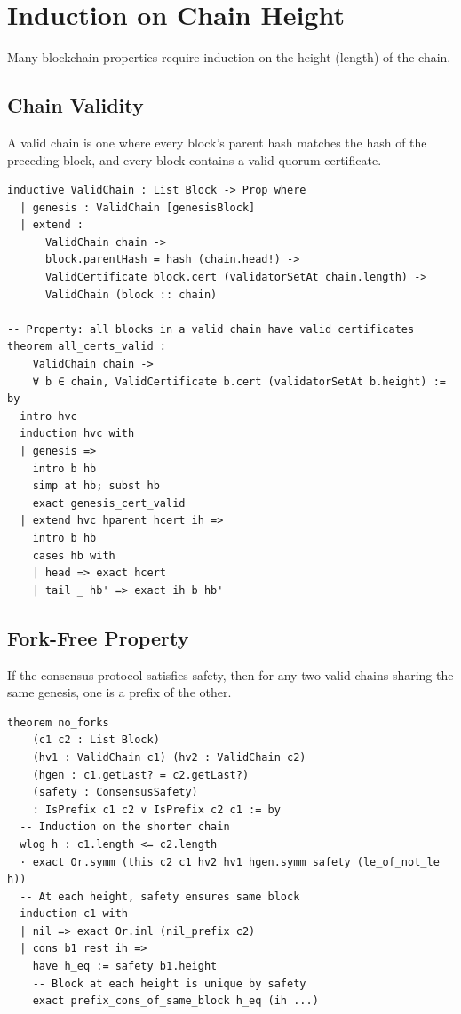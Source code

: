 \section{Induction on Chain Height}


Many blockchain properties require induction on the height (length) of the chain.

\subsection{Chain Validity}

A valid chain is one where every block's parent hash matches the hash of the preceding
block, and every block contains a valid quorum certificate.

\begin{lstlisting}[language=Lean,caption={Chain validity by induction on height}]
inductive ValidChain : List Block -> Prop where
  | genesis : ValidChain [genesisBlock]
  | extend :
      ValidChain chain ->
      block.parentHash = hash (chain.head!) ->
      ValidCertificate block.cert (validatorSetAt chain.length) ->
      ValidChain (block :: chain)

-- Property: all blocks in a valid chain have valid certificates
theorem all_certs_valid :
    ValidChain chain ->
    ∀ b ∈ chain, ValidCertificate b.cert (validatorSetAt b.height) := by
  intro hvc
  induction hvc with
  | genesis =>
    intro b hb
    simp at hb; subst hb
    exact genesis_cert_valid
  | extend hvc hparent hcert ih =>
    intro b hb
    cases hb with
    | head => exact hcert
    | tail _ hb' => exact ih b hb'
\end{lstlisting}

\subsection{Fork-Free Property}

\begin{theorem}[No Forks]
If the consensus protocol satisfies safety, then for any two valid chains sharing the
same genesis, one is a prefix of the other.
\end{theorem}

\begin{lstlisting}[language=Lean,caption={Fork-freedom from safety}]
theorem no_forks
    (c1 c2 : List Block)
    (hv1 : ValidChain c1) (hv2 : ValidChain c2)
    (hgen : c1.getLast? = c2.getLast?)
    (safety : ConsensusSafety)
    : IsPrefix c1 c2 ∨ IsPrefix c2 c1 := by
  -- Induction on the shorter chain
  wlog h : c1.length <= c2.length
  · exact Or.symm (this c2 c1 hv2 hv1 hgen.symm safety (le_of_not_le h))
  -- At each height, safety ensures same block
  induction c1 with
  | nil => exact Or.inl (nil_prefix c2)
  | cons b1 rest ih =>
    have h_eq := safety b1.height
    -- Block at each height is unique by safety
    exact prefix_cons_of_same_block h_eq (ih ...)
\end{lstlisting}

